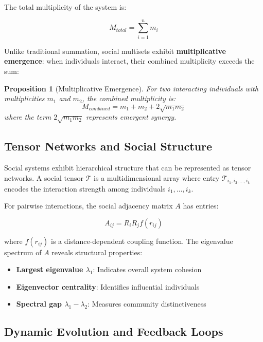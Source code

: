 \documentclass[11pt,a4paper]{article}
\newtheorem{proposition}{Proposition}
\begin{document}
The total multiplicity of the system is:

\begin{equation}
M_{total} = \sum_{i=1}^{n} m_i
\end{equation}

Unlike traditional summation, social multisets exhibit \textbf{multiplicative emergence}: when individuals interact, their combined multiplicity exceeds the sum:

\begin{proposition}[Multiplicative Emergence]
For two interacting individuals with multiplicities $m_1$ and $m_2$, the combined multiplicity is:
\begin{equation}
M_{combined} = m_1 + m_2 + 2\sqrt{m_1 m_2}
\end{equation}
where the term $2\sqrt{m_1 m_2}$ represents emergent synergy.
\end{proposition}

\subsection{Tensor Networks and Social Structure}

Social systems exhibit hierarchical structure that can be represented as tensor networks. A social tensor $\mathcal{T}$ is a multidimensional array where entry $\mathcal{T}_{i_1, i_2, \ldots, i_k}$ encodes the interaction strength among individuals $i_1, \ldots, i_k$.

For pairwise interactions, the social adjacency matrix $A$ has entries:

\begin{equation}
A_{ij} = R_i R_j f(r_{ij})
\end{equation}

where $f(r_{ij})$ is a distance-dependent coupling function. The eigenvalue spectrum of $A$ reveals structural properties:

\begin{itemize}
    \item \textbf{Largest eigenvalue $\lambda_1$}: Indicates overall system cohesion
    \item \textbf{Eigenvector centrality}: Identifies influential individuals
    \item \textbf{Spectral gap $\lambda_1 - \lambda_2$}: Measures community distinctiveness
\end{itemize}

\subsection{Dynamic Evolution and Feedback Loops}
\end{document}
